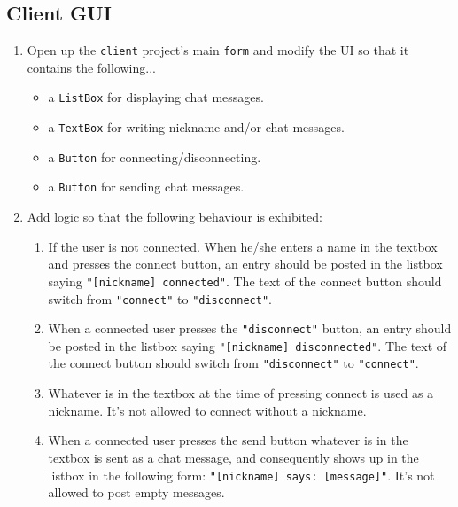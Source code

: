 \documentclass{article}
\newcounter{stepcounter}
\newenvironment{steps}{ 
  \begin{enumerate}[label=\color{red}Step \thesection-\theenumi)]
    \setcounter{enumi}{\value{stepcounter}}
}{
  \setcounter{stepcounter}{\value{enumi}}
  \end{enumerate}
}
\begin{document}
\subsection{Client GUI}
 \begin{steps}
\item Open up the \texttt{client} project's main \texttt{form} and modify the UI so that it contains the following...
  \begin{itemize}
  \item a \texttt{ListBox} for displaying chat messages.
  \item a \texttt{TextBox} for writing nickname and/or chat messages.
  \item a \texttt{Button} for connecting/disconnecting.
  \item a \texttt{Button} for sending chat messages.
  \end{itemize}
\item Add logic so that the following behaviour is exhibited:
  \begin{enumerate}
  \item If the user is not connected. When he/she enters a name in the textbox and presses the connect button, an entry should be posted in the listbox saying \texttt{"[nickname] connected"}. The text of the connect button should switch from \texttt{"connect"} to \texttt{"disconnect"}.
  \item When a connected user presses the \texttt{"disconnect"} button, an entry should be posted in the listbox saying \texttt{"[nickname] disconnected"}. The text of the connect button should switch from \texttt{"disconnect"} to \texttt{"connect"}.
  \item Whatever is in the textbox at the time of pressing connect is used as a nickname. It's not allowed to connect without a nickname.
  \item When a connected user presses the send button whatever is in the textbox is sent as a chat message, and consequently shows up in the listbox in the following form: \texttt{"[nickname] says: [message]"}. It's not allowed to post empty messages.
  \end{enumerate}
\end{steps}
\end{document}
